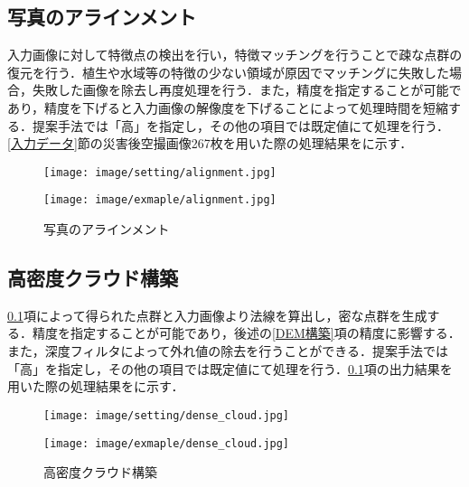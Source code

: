     \subsection{写真のアラインメント}
      \label{写真のアラインメント}
      入力画像に対して特徴点の検出を行い，特徴マッチングを行うことで疎な点群の復元を行う．植生や水域等の特徴の少ない領域が原因でマッチングに失敗した場合，失敗した画像を除去し再度処理を行う．また，精度を指定することが可能であり，精度を下げると入力画像の解像度を下げることによって処理時間を短縮する．提案手法では「高」を指定し，その他の項目では既定値にて処理を行う．\ref{入力データ}節の災害後空撮画像267枚を用いた際の処理結果をに示す．

      \begin{figure}[t]
        \begin{minipage}[c]{0.45\hsize}
          \centering
          \texttt{[image: image/setting/alignment.jpg]}
        \end{minipage}
        \begin{minipage}[c]{0.45\hsize}
          \centering
          \texttt{[image: image/exmaple/alignment.jpg]}
        \end{minipage}
        \caption{写真のアラインメント}
        \label{写真のアラインメント結果}
      \end{figure}


    \subsection{高密度クラウド構築}
      \label{高密度クラウド構築}
      \ref{写真のアラインメント}項によって得られた点群と入力画像より法線を算出し，密な点群を生成する．精度を指定することが可能であり，後述の\ref{DEM構築}項の精度に影響する．また，深度フィルタによって外れ値の除去を行うことができる．提案手法では「高」を指定し，その他の項目では既定値にて処理を行う．\ref{写真のアラインメント}項の出力結果を用いた際の処理結果をに示す．

      \begin{figure}[t]
        \begin{minipage}[c]{0.45\hsize}
          \centering
          \texttt{[image: image/setting/dense\_cloud.jpg]}
          \label{高密度クラウド構築設定値}
        \end{minipage}
        \begin{minipage}[c]{0.45\hsize}
          \centering
          \texttt{[image: image/exmaple/dense\_cloud.jpg]}
        \end{minipage}
        \caption{高密度クラウド構築}
        \label{高密度クラウド構築結果}
      \end{figure}


